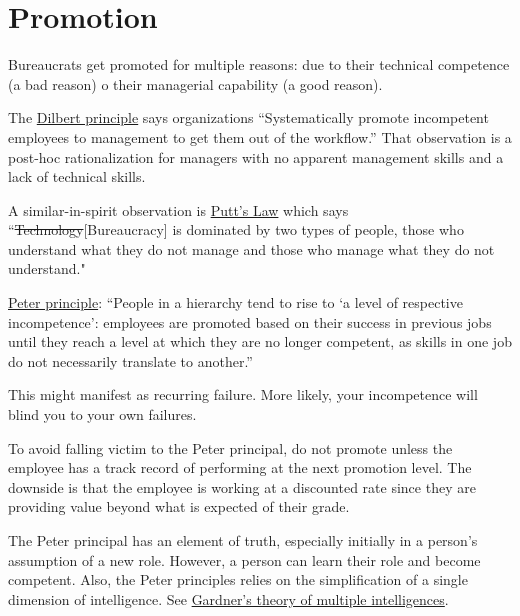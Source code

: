 \section{Promotion\label{sec:promotion}}

Bureaucrats get promoted for multiple reasons: due to their technical competence (a bad reason) o their managerial capability (a good reason).  

The \href{https://en.wikipedia.org/wiki/Dilbert_principle}{Dilbert principle}
says organizations
``Systematically promote incompetent employees to management to get them out of the workflow.''
That observation is a post-hoc rationalization for managers with no apparent management skills and a lack of technical skills. 

A similar-in-spirit observation is 
\href{https://en.wikipedia.org/wiki/Putt\%27s_Law_and_the_Successful_Technocrat}{Putt's Law}
which says
``\sout{Technology}[Bureaucracy] is dominated by two types of people, those who understand what they do not manage and those who manage what they do not understand."


\href{https://en.wikipedia.org/wiki/Peter_principle}{Peter principle}: 
``People in a hierarchy tend to rise to `a level of respective incompetence': employees are promoted based on their success in previous jobs until they reach a level at which they are no longer competent, as skills in one job do not necessarily translate to another.''

This might manifest as recurring failure. More likely, your incompetence will blind you to your own failures.

To avoid falling victim to the Peter principal, do not promote unless the employee has a track record of performing at the next promotion level. The downside is that the employee is working at a discounted rate since they are providing value beyond what is expected of their grade.


The Peter principal \cite{1970_Peter} has an element of truth, especially initially in a person's assumption of a new role. However, a person can learn their role and become competent. Also, the Peter principles relies on the simplification of a single dimension of intelligence. 
See \href{https://en.wikipedia.org/wiki/Theory_of_multiple_intelligences}{Gardner's theory of multiple intelligences}.


